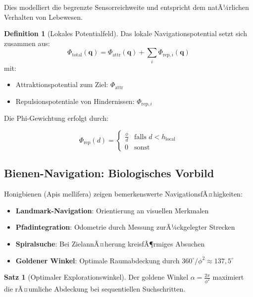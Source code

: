 ﻿\documentclass[a4paper,12pt]{article}
\theoremstyle{definition}
\newtheorem{definition}{Definition}
\newtheorem{satz}{Satz}
\begin{document}
Dies modelliert die begrenzte Sensorreichweite und entspricht dem natÃ¼rlichen Verhalten von Lebewesen.

\begin{definition}[Lokales Potentialfeld]
	Das lokale Navigationspotential setzt sich zusammen aus:
	\begin{equation}
		\Phi_{\text{total}}(\mathbf{q}) = \Phi_{\text{attr}}(\mathbf{q}) + \sum_i \Phi_{\text{rep},i}(\mathbf{q})
	\end{equation}
	mit:
	\begin{itemize}
		\item[-] Attraktionspotential zum Ziel: $\Phi_{\text{attr}}$
		\item[-] Repulsionspotentiale von Hindernissen: $\Phi_{\text{rep},i}$
	\end{itemize}
\end{definition}

Die Phi-Gewichtung erfolgt durch:

\begin{equation}
\Phi_{\text{rep}}(d) = \begin{cases}
\frac{\phi}{d} & \text{falls } d < h_{\text{local}} \\
0 & \text{sonst}
\end{cases}
\end{equation}

\subsection{Bienen-Navigation: Biologisches Vorbild}

Honigbienen (Apis mellifera) zeigen bemerkenswerte NavigationsfÃ¤higkeiten:

\begin{itemize}
	\item[-] \textbf{Landmark-Navigation}: Orientierung an visuellen Merkmalen
	\item[-] \textbf{Pfadintegration}: Odometrie durch Messung zurÃ¼ckgelegter Strecken
	\item[-] \textbf{Spiralsuche}: Bei ZielannÃ¤herung kreisfÃ¶rmiges Absuchen
	\item[-] \textbf{Goldener Winkel}: Optimale Raumabdeckung durch $360^\circ/\phi^2 \approx 137{,}5^\circ$
\end{itemize}

\begin{satz}[Optimaler Explorationswinkel]
	Der goldene Winkel $\alpha = \frac{2\pi}{\phi^2}$ maximiert die rÃ¤umliche Abdeckung bei sequentiellen Suchschritten.
\end{satz}
\end{document}
